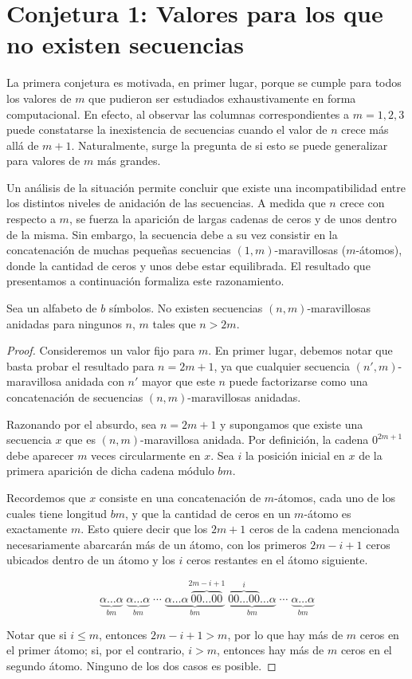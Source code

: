 \section{Conjetura 1: Valores para los que no existen secuencias}

La primera conjetura es motivada, en primer lugar, porque se cumple para todos
los valores de $m$ que pudieron ser estudiados exhaustivamente en forma
computacional.
En efecto, al observar las columnas correspondientes a $m = 1, 2, 3$ puede
constatarse la inexistencia de secuencias cuando el valor de $n$ crece
más allá de $m + 1$. Naturalmente, surge la pregunta de si esto se puede
generalizar para valores de $m$ más grandes.

Un análisis de la situación permite concluir que existe una
incompatibilidad entre los distintos niveles de anidación de las secuencias.
A medida que $n$ crece con respecto a $m$, se fuerza la aparición de largas
cadenas de ceros y de unos dentro de la misma. Sin embargo, la secuencia debe
a su vez consistir en la concatenación de muchas pequeñas secuencias
$(1,m)$-maravillosas ($m$-átomos), donde la cantidad de ceros y unos debe estar
equilibrada.
El resultado que presentamos a continuación formaliza este razonamiento.

\begin{theorem}
	Sea un alfabeto de $b$ símbolos.
	No existen secuencias $(n,m)$-maravillosas anidadas para ningunos $n$, $m$
	tales que $n > 2m$.
\end{theorem}

\begin{proof}
	Consideremos un valor fijo para $m$.
	En primer lugar, debemos notar que basta probar el resultado para $n = 2m +
		1$, ya que cualquier secuencia $(n',m)$-maravillosa anidada con $n'$ mayor
		que este $n$ puede factorizarse como una concatenación de secuencias
	$(n,m)$-maravillosas anidadas.

		Razonando por el absurdo, sea $n = 2m + 1$ y supongamos que existe una
	secuencia $x$ que es $(n,m)$-maravillosa anidada.
	Por definición, la cadena $0^{2m+1}$ debe aparecer $m$ veces circularmente
	en $x$. Sea $i$ la posición inicial en $x$ de la primera aparición de dicha
	cadena módulo $bm$.

	Recordemos que $x$ consiste en una concatenación de $m$-átomos, cada uno de
	los cuales tiene longitud $bm$, y que la cantidad de ceros en un $m$-átomo
	es exactamente $m$. Esto quiere decir que los $2m+1$ ceros de la cadena mencionada
	necesariamente abarcarán más de un átomo, con los primeros $2m - i + 1$ ceros
	ubicados dentro de un átomo y los $i$ ceros restantes en el átomo
	siguiente.

	\[ \underbrace{\alpha\dots\alpha}_{bm}
		\; \underbrace{\alpha\dots\alpha}_{bm} \; \cdots
		\; \underbrace{\alpha\dots\alpha\overbrace{00\dots00}^{2m-i+1}}_{bm}
		\; \underbrace{\overbrace{00\dots00}^{i}\dots\alpha}_{bm} \; \cdots
		\; \underbrace{\alpha\dots\alpha}_{bm} \]

	Notar que si $i \leq m$, entonces $2m - i + 1 > m$, por lo que hay
	más de $m$ ceros en el primer átomo; si, por el contrario, $i > m$, entonces
	hay más de $m$ ceros en el segundo átomo. Ninguno de los dos casos es posible.
\end{proof}

